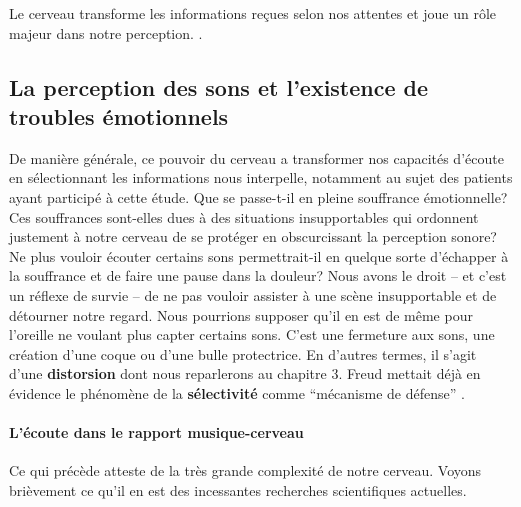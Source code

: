 Le cerveau
transforme les informations reçues selon nos attentes et joue un
rôle majeur dans notre perception.
\autocite[p. 43]{roque:lecoute}.
%
\subsection{La perception des sons et l'existence de troubles
  émotionnels}
De manière générale, ce pouvoir du cerveau a transformer nos capacités d'écoute en sélectionnant les informations nous interpelle, notamment au sujet des  patients ayant participé à cette étude.
Que se passe-t-il en pleine
souffrance émotionnelle? Ces souffrances sont-elles dues à des situations
insupportables qui
ordonnent justement à notre cerveau de se protéger en obscurcissant la
perception sonore?  Ne plus vouloir écouter certains
sons permettrait-il en quelque sorte d'échapper à la souffrance et de faire une
pause dans la douleur? Nous avons le droit -- et c'est un réflexe de
survie -- de ne pas vouloir assister à une scène insupportable et de détourner
notre regard.  Nous pourrions supposer qu'il en est de même pour l'oreille ne voulant plus capter
certains sons. C'est une fermeture aux sons, une création d'une coque ou d'une bulle protectrice. En d'autres termes, il s'agit d'une \textbf{distorsion} dont nous reparlerons au chapitre 3.
Freud mettait déjà en évidence le phénomène de la
\textbf{sélectivité } comme ``mécanisme de défense'' \autocite{ Freud}.













\paragraph{ L'écoute dans le rapport
  musique-cerveau}
Ce qui précède atteste de la très grande complexité de notre cerveau.
Voyons brièvement ce qu'il en est des incessantes recherches scientifiques actuelles.

